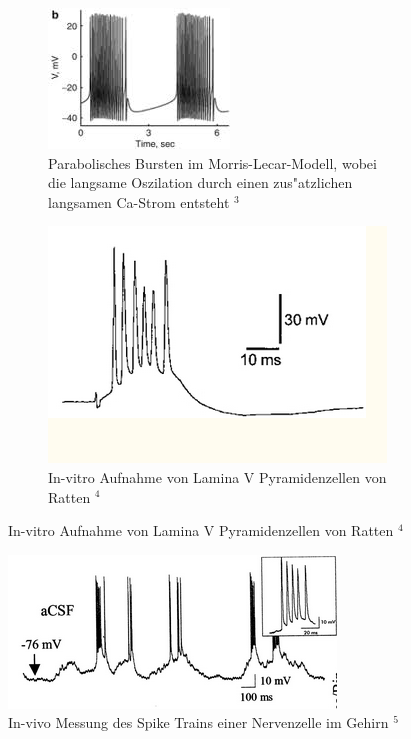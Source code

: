 \documentclass[12pt,a4paper]{article}
\begin{document}
\begin{figure}[H]
	\centering
	\begin{subfigure}{.45\textwidth}
		\centering
		\includegraphics[scale=0.8]{27.png}
		\caption*{
			Parabolisches Bursten im Morris-Lecar-Modell, wobei die langsame Oszilation durch einen zus"atzlichen langsamen Ca-Strom entsteht $^3$}
		\label{fig27}
	\end{subfigure}\hspace{5mm}%
	\begin{subfigure}{.45\textwidth}
		\centering
		\includegraphics[scale=0.48]{42.png}
		\caption*{
			In-vitro Aufnahme von Lamina V Pyramidenzellen von Ratten $^4$}
		\label{fig42}
	\end{subfigure}
\end{figure}
\begin{figure}[H]
	\centering
	\includegraphics[scale=.8]{28.png}
	\caption*{In-vivo Messung des Spike Trains einer Nervenzelle im Gehirn $^5$}
	\label{fig28}
\end{figure}
\end{document}
